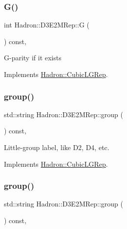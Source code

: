 \subsubsection{\texorpdfstring{G()}{G()}\hspace{0.1cm}{\footnotesize\ttfamily [2/2]}}
{\footnotesize\ttfamily int Hadron\+::\+D3\+E2\+M\+Rep\+::G (\begin{DoxyParamCaption}{ }\end{DoxyParamCaption}) const\hspace{0.3cm}{\ttfamily [inline]}, {\ttfamily [virtual]}}

G-\/parity if it exists 

Implements \mbox{\hyperlink{structHadron_1_1CubicLGRep_ace26f7b2d55e3a668a14cb9026da5231}{Hadron\+::\+Cubic\+L\+G\+Rep}}.

\mbox{\label{structHadron_1_1D3E2MRep_a16828fce715dd1dea202c71b41476ff2}} 
\subsubsection{\texorpdfstring{group()}{group()}\hspace{0.1cm}{\footnotesize\ttfamily [1/2]}}
{\footnotesize\ttfamily std\+::string Hadron\+::\+D3\+E2\+M\+Rep\+::group (\begin{DoxyParamCaption}{ }\end{DoxyParamCaption}) const\hspace{0.3cm}{\ttfamily [inline]}, {\ttfamily [virtual]}}

Little-\/group label, like D2, D4, etc. 

Implements \mbox{\hyperlink{structHadron_1_1CubicLGRep_a9bdb14b519a611d21379ed96a3a9eb41}{Hadron\+::\+Cubic\+L\+G\+Rep}}.

\mbox{\label{structHadron_1_1D3E2MRep_a16828fce715dd1dea202c71b41476ff2}} 
\subsubsection{\texorpdfstring{group()}{group()}\hspace{0.1cm}{\footnotesize\ttfamily [2/2]}}
{\footnotesize\ttfamily std\+::string Hadron\+::\+D3\+E2\+M\+Rep\+::group (\begin{DoxyParamCaption}{ }\end{DoxyParamCaption}) const\hspace{0.3cm}{\ttfamily [inline]}, {\ttfamily [virtual]}}

